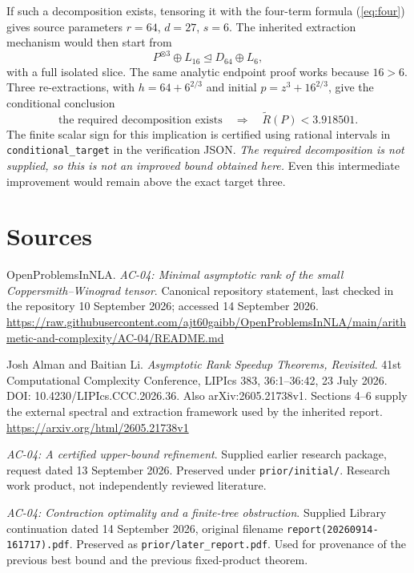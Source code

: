 \documentclass[11pt,letterpaper]{article}
\theoremstyle{definition}\newtheorem{definition}[theorem]{Definition}
\theoremstyle{remark}\newtheorem{remark}[theorem]{Remark}
\newcommand{\AR}{\widetilde R}
\newcommand{\degto}{\trianglelefteq}
\begin{document}
If such a decomposition exists, tensoring it with the four-term formula (\ref{eq:four}) gives source parameters $r=64$, $d=27$, $s=6$. The inherited extraction mechanism would then start from
\[
P^{\otimes3}\oplus L_{16}\degto D_{64}\oplus L_6,
\]
with a full isolated slice. The same analytic endpoint proof works because $16>6$. Three re-extractions, with $h=64+6^{2/3}$ and initial $p=z^3+16^{2/3}$, give the conditional conclusion
\[
\text{the required decomposition exists}\quad\Longrightarrow\quad
\AR(P)<3.918501.
\]
The finite scalar sign for this implication is certified using rational intervals in \texttt{conditional\_target} in the verification JSON. \emph{The required decomposition is not supplied, so this is not an improved bound obtained here.} Even this intermediate improvement would remain above the exact target three.

\clearpage
\section*{Sources}
\begin{enumerate}[label={[\arabic*]},leftmargin=2em,itemsep=0.5em]
\item OpenProblemsInNLA. \emph{AC-04: Minimal asymptotic rank of the small Coppersmith--Winograd tensor}. Canonical repository statement, last checked in the repository 10 September 2026; accessed 14 September 2026.\newline
\url{https://raw.githubusercontent.com/ajt60gaibb/OpenProblemsInNLA/main/arithmetic-and-complexity/AC-04/README.md}
\item Josh Alman and Baitian Li. \emph{Asymptotic Rank Speedup Theorems, Revisited}. 41st Computational Complexity Conference, LIPIcs 383, 36:1--36:42, 23 July 2026. DOI: 10.4230/LIPIcs.CCC.2026.36. Also arXiv:2605.21738v1. Sections 4--6 supply the external spectral and extraction framework used by the inherited report.\newline
\url{https://arxiv.org/html/2605.21738v1}
\item \emph{AC-04: A certified upper-bound refinement}. Supplied earlier research package, request dated 13 September 2026. Preserved under \texttt{prior/initial/}. Research work product, not independently reviewed literature.
\item \emph{AC-04: Contraction optimality and a finite-tree obstruction}. Supplied Library continuation dated 14 September 2026, original filename \texttt{report(20260914-161717).pdf}. Preserved as \texttt{prior/later\_report.pdf}. Used for provenance of the previous best bound and the previous fixed-product theorem.
\end{enumerate}
\end{document}
